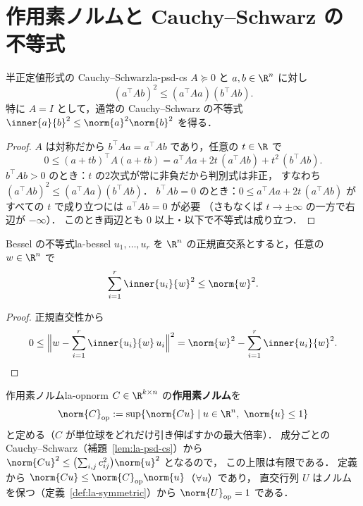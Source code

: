 \section{作用素ノルムと Cauchy--Schwarz の不等式}

\begin{lemma}{半正定値形式の Cauchy--Schwarz}{la-psd-cs}
  $A\succeq0$ と $a,b\in\R^n$ に対し
  \[
    (a^\top Ab)^2\leq(a^\top Aa)(b^\top Ab).
  \]
  特に $A=I$ として，通常の Cauchy--Schwarz の不等式
  $\inner{a}{b}^2\leq\norm{a}^2\norm{b}^2$ を得る．
\end{lemma}

\begin{proof}
  $A$ は対称だから $b^\top Aa=a^\top Ab$ であり，任意の $t\in\R$ で
  \[
    0\leq(a+tb)^\top A(a+tb)
    =a^\top Aa+2t\,(a^\top Ab)+t^2\,(b^\top Ab).
  \]
  $b^\top Ab>0$ のとき：$t$ の2次式が常に非負だから判別式は非正，
  すなわち $(a^\top Ab)^2\leq(a^\top Aa)(b^\top Ab)$．
  $b^\top Ab=0$ のとき：$0\leq a^\top Aa+2t\,(a^\top Ab)$ が
  すべての $t$ で成り立つには $a^\top Ab=0$ が必要
  （さもなくば $t\to\pm\infty$ の一方で右辺が $-\infty$）．
  このとき両辺とも $0$ 以上・以下で不等式は成り立つ．
\end{proof}

\begin{claim}{Bessel の不等式}{la-bessel}
  $u_1,\dots,u_r$ を $\R^n$ の正規直交系とすると，任意の $w\in\R^n$ で
  \[
    \sum_{i=1}^r\inner{u_i}{w}^2\leq\norm{w}^2.
  \]
\end{claim}

\begin{proof}
  正規直交性から
  \[
    0\leq\Bigl\lVert w-\sum_{i=1}^r\inner{u_i}{w}\,u_i\Bigr\rVert^2
    =\norm{w}^2-\sum_{i=1}^r\inner{u_i}{w}^2.  \qedhere
  \]
\end{proof}

\begin{definition}{作用素ノルム}{la-opnorm}
  $C\in\R^{k\times n}$ の\textbf{作用素ノルム}を
  \[
    \norm{C}_{\mathrm{op}}
    :=
    \sup\{\norm{Cu}\mid u\in\R^n,\ \norm{u}\leq1\}
  \]
  と定める（$C$ が単位球をどれだけ引き伸ばすかの最大倍率）．
  成分ごとの Cauchy--Schwarz（補題~\ref{lem:la-psd-cs}）から
  $\norm{Cu}^2\leq\bigl(\sum_{i,j}c_{ij}^2\bigr)\norm{u}^2$ となるので，
  この上限は有限である．
  定義から $\norm{Cu}\leq\norm{C}_{\mathrm{op}}\norm{u}$（$\forall u$）であり，
  直交行列 $U$ はノルムを保つ（定義~\ref{def:la-symmetric}）から
  $\norm{U}_{\mathrm{op}}=1$ である．
\end{definition}

